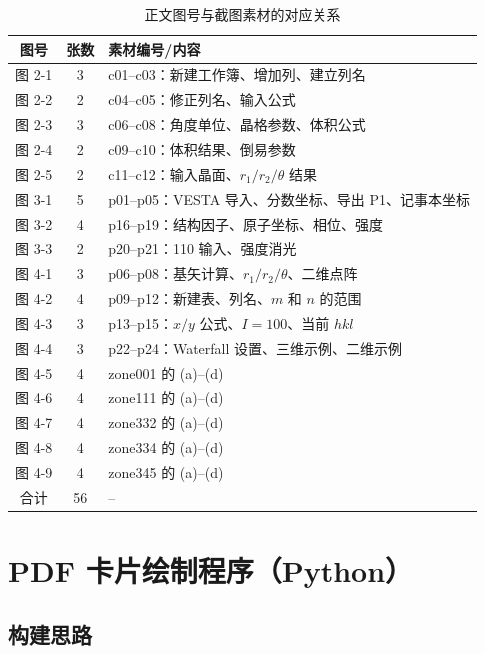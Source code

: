 \begin{table}[H]
  \centering
  \caption{正文图号与截图素材的对应关系}
  \label{tab:image-index}
  \small
  \setlength{\tabcolsep}{6pt}
  \renewcommand{\arraystretch}{1.02}
  \begin{tabular}{ccl}
    \toprule
    图号 & 张数 & 素材编号/内容 \\
    \midrule
    图 2-1 & 3 & c01--c03：新建工作簿、增加列、建立列名 \\
    图 2-2 & 2 & c04--c05：修正列名、输入公式 \\
    图 2-3 & 3 & c06--c08：角度单位、晶格参数、体积公式 \\
    图 2-4 & 2 & c09--c10：体积结果、倒易参数 \\
    图 2-5 & 2 & c11--c12：输入晶面、$r_1/r_2/\theta$ 结果 \\
    图 3-1 & 5 & p01--p05：VESTA 导入、分数坐标、导出 P1、记事本坐标 \\
    图 3-2 & 4 & p16--p19：结构因子、原子坐标、相位、强度 \\
    图 3-3 & 2 & p20--p21：110 输入、强度消光 \\
    图 4-1 & 3 & p06--p08：基矢计算、$r_1/r_2/\theta$、二维点阵 \\
    图 4-2 & 4 & p09--p12：新建表、列名、$m$ 和 $n$ 的范围 \\
    图 4-3 & 3 & p13--p15：$x/y$ 公式、$I=100$、当前 $hkl$ \\
    图 4-4 & 3 & p22--p24：Waterfall 设置、三维示例、二维示例 \\
    图 4-5 & 4 & zone001 的 (a)--(d) \\
    图 4-6 & 4 & zone111 的 (a)--(d) \\
    图 4-7 & 4 & zone332 的 (a)--(d) \\
    图 4-8 & 4 & zone334 的 (a)--(d) \\
    图 4-9 & 4 & zone345 的 (a)--(d) \\
    \midrule
    合计 & 56 & -- \\
    \bottomrule
  \end{tabular}
\end{table}

    \section{PDF 卡片绘制程序（Python）}
    \label{app:pdfcard-code}

    \subsection{构建思路}

